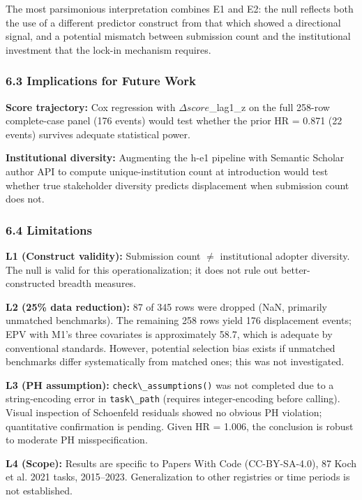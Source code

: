 The most parsimonious interpretation combines E1 and E2: the null reflects both the use of a different predictor construct from that which showed a directional signal, and a potential mismatch between submission count and the institutional investment that the lock-in mechanism requires.

\subsubsection{6.3 Implications for Future Work}

\textbf{Score trajectory:} Cox regression with $\Delta score$\_lag1\_z on the full 258-row complete-case panel (176 events) would test whether the prior HR = 0.871 (22 events) survives adequate statistical power.

\textbf{Institutional diversity:} Augmenting the h-e1 pipeline with Semantic Scholar author API to compute unique-institution count at introduction would test whether true stakeholder diversity predicts displacement when submission count does not.

\subsubsection{6.4 Limitations}

\textbf{L1 (Construct validity):} Submission count $\neq$ institutional adopter diversity. The null is valid for this operationalization; it does not rule out better-constructed breadth measures.

\textbf{L2 (25\% data reduction):} 87 of 345 rows were dropped (NaN, primarily unmatched benchmarks). The remaining 258 rows yield 176 displacement events; EPV with M1's three covariates is approximately 58.7, which is adequate by conventional standards. However, potential selection bias exists if unmatched benchmarks differ systematically from matched ones; this was not investigated.

\textbf{L3 (PH assumption):} \texttt{check\textbackslash \_assumptions()} was not completed due to a string-encoding error in \texttt{task\textbackslash \_path} (requires integer-encoding before calling). Visual inspection of Schoenfeld residuals showed no obvious PH violation; quantitative confirmation is pending. Given HR = 1.006, the conclusion is robust to moderate PH misspecification.

\textbf{L4 (Scope):} Results are specific to Papers With Code (CC-BY-SA-4.0), 87 Koch et al. 2021 tasks, 2015--2023. Generalization to other registries or time periods is not established.

